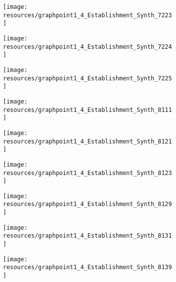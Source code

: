 \documentclass[12pt]{article}
\begin{document}
\begin{figure}[H]
	\centering
	\begin{subfigure}[b]{0.4\textwidth}
	    \texttt{[image: resources/graphpoint1\_4\_Establishment\_Synth\_7223]}
	\end{subfigure}
	\begin{subfigure}[b]{0.4\textwidth}
	    \texttt{[image: resources/graphpoint1\_4\_Establishment\_Synth\_7224]}
	\end{subfigure}
\end{figure}
\begin{figure}[H]
	\centering
	\begin{subfigure}[b]{0.4\textwidth}
	    \texttt{[image: resources/graphpoint1\_4\_Establishment\_Synth\_7225]}
	\end{subfigure}
	\begin{subfigure}[b]{0.4\textwidth}
	    \texttt{[image: resources/graphpoint1\_4\_Establishment\_Synth\_8111]}
	\end{subfigure}
\end{figure}
\begin{figure}[H]
	\centering
	\begin{subfigure}[b]{0.4\textwidth}
	    \texttt{[image: resources/graphpoint1\_4\_Establishment\_Synth\_8121]}
	\end{subfigure}
	\begin{subfigure}[b]{0.4\textwidth}
	    \texttt{[image: resources/graphpoint1\_4\_Establishment\_Synth\_8123]}
	\end{subfigure}
\end{figure}
\begin{figure}[H]
	\centering
	\begin{subfigure}[b]{0.4\textwidth}
	    \texttt{[image: resources/graphpoint1\_4\_Establishment\_Synth\_8129]}
	\end{subfigure}
	\begin{subfigure}[b]{0.4\textwidth}
	    \texttt{[image: resources/graphpoint1\_4\_Establishment\_Synth\_8131]}
	\end{subfigure}
\end{figure}
\begin{figure}[H]
	\centering
	\begin{subfigure}[b]{0.4\textwidth}
	    \texttt{[image: resources/graphpoint1\_4\_Establishment\_Synth\_8139]}
	\end{subfigure}
\end{figure}
\end{document}

